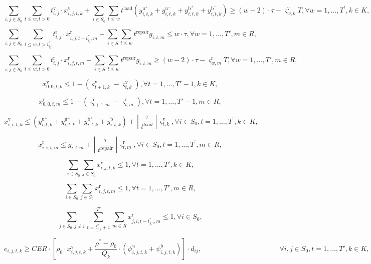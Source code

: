 \documentclass[
  english,
]{article}
\begin{document}
\begin{otherlanguage}{english}
\[\tag{37}\sum\limits_{i,j \in S_{0}}\sum\limits_{t \leq w,t > 0}t_{i,j}^{\text{v}} \cdot x_{i,j,t,k}^{\text{v}} + \sum\limits_{i \in S_{0}}\sum\limits_{t \leq w}t^{\text{load}}\left( {y_{i,t,k}^{\text{u}^{+}} + y_{i,t,k}^{\text{u}^{-}} + y_{i,t,k}^{\text{b}^{+}} + y_{i,t,k}^{\text{b}^{-}}} \right) \geq \left( {w - 2} \right) \cdot \tau - \varsigma_{w,k}^{\text{v}}T,\forall w = 1,...,T^{'},k \in K,\]

\[\tag{38}\sum\limits_{i,j \in S_{0}}{\sum\limits_{t \leq w,t > t_{\mathit{ij}}^{''}}t_{i,j}^{\text{r}}} \cdot x_{i,j,t - t_{\mathit{ij}}^{''},m}^{\text{r}} + \sum\limits_{i \in S}{\sum\limits_{t \leq w}{t^{\text{repair}}g_{i,t,m}}} \leq w \cdot \tau,\forall w = 1,...,T',m \in R,\]

\[\tag{39}\sum\limits_{i,j \in S_{0}}{\sum\limits_{t \leq w,t > 0}t_{i,j}^{\text{r}}} \cdot x_{i,j,t,m}^{\text{r}} + \sum\limits_{i \in S}{\sum\limits_{t \leq w}{t^{\text{repair}}g_{i,t,m}}} \geq \left( {w - 2} \right) \cdot \tau - \varsigma_{w,m}^{\text{r}}T,\forall w = 1,...,T',m \in R,\]

\[\tag{40}x_{0,0,t,k}^{\text{v}} \leq 1 - \left( \varsigma_{t + 1,k}^{\text{v}} - \varsigma_{t,k}^{\text{v}} \right),\forall t = 1,\ldots,T' - 1,k \in K,\]

\[\tag{41}x_{0,0,t,m}^{\text{r}} \leq 1 - \left( \varsigma_{t + 1,m}^{\text{r}} - \varsigma_{t,m}^{\text{r}} \right),\forall t = 1,\ldots,T' - 1,m \in R,\]

\[\tag{42}x_{i,i,t,k}^{\text{v}} \leq \left( {y_{i,t,k}^{\text{u}^{+}} + y_{i,t,k}^{\text{u}^{-}} + y_{i,t,k}^{\text{b}^{+}} + y_{i,t,k}^{\text{b}^{-}}} \right) + \left\lfloor \frac{\tau}{t^{load}} \right\rfloor \varsigma_{t,k}^{\text{v}},\forall i \in S_{0},t = 1,\ldots,T^{'},k \in K,\]

\[\tag{43}x_{i,i,t,m}^{\text{r}} \leq g_{i,t,m} + \left\lfloor \frac{\tau}{t^{\text{repair}}} \right\rfloor \varsigma_{t,m}^{\text{r}},\forall i \in S_{0},t = 1,\ldots,T^{'},m \in R,\]

\[\tag{44}\sum\limits_{i \in S_{0}}{\sum\limits_{j \in S_{0}}x_{i,j,t,k}^{\text{v}}} \leq 1,\forall t = 1,...,T',k \in K,\]

\[\tag{45}\sum\limits_{i \in S_{0}}{\sum\limits_{j \in S_{0}}x_{i,j,t,m}^{\text{r}}} \leq 1,\forall t = 1,...,T',m \in R,\]

\[\tag{46}\sum\limits_{j \in S_{0},j \neq i}{\sum\limits_{t = t_{j,i}^{''} + 1}^{T'}{\sum\limits_{m \in R}x_{j,i,t - t_{j,i}^{''},m}^{\text{r}}}} \leq 1,\forall i \in S_{0},\]

\[\tag{47}e_{i,j,t,k} \geq CER \cdot \left\lbrack {\rho_{0} \cdot x_{i,j,t,k}^{\text{v}} + \frac{\rho^{\ast} - \rho_{0}}{Q_{k}} \cdot \left( {\psi_{i,j,t,k}^{\text{u}} + \psi_{i,j,t,k}^{\text{b}}} \right)} \right\rbrack \cdot d_{\mathit{ij}},\mspace{100mu}\mspace{100mu}\forall i,j \in S_{0},t = 1,...,T',k \in K,\]


\end{otherlanguage}
\end{document}
